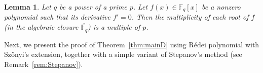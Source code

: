 \documentclass[12pt,reqno]{amsart}
\newtheorem{lem}[thm]{Lemma}
\theoremstyle{definition}
\newcommand{\F}{\mathbb{F}}
\begin{document}
\begin{lem}\label{lem:derivative0}
Let $q$ be a power of a prime $p$. Let $f(x) \in \F_q [x]$ be a nonzero polynomial such that its derivative $f'=0$. Then the multiplicity of each root of $f$ (in the algebraic closure $\overline{\F_q}$) is a multiple of $p$.
\end{lem}

Next, we present the proof of Theorem~\ref{thm:mainD} using R\'edei polynomial with Sz\H{o}nyi's extension, together with a simple variant of Stepanov's method (see Remark~\ref{rem:Stepanov}).
\end{document}
